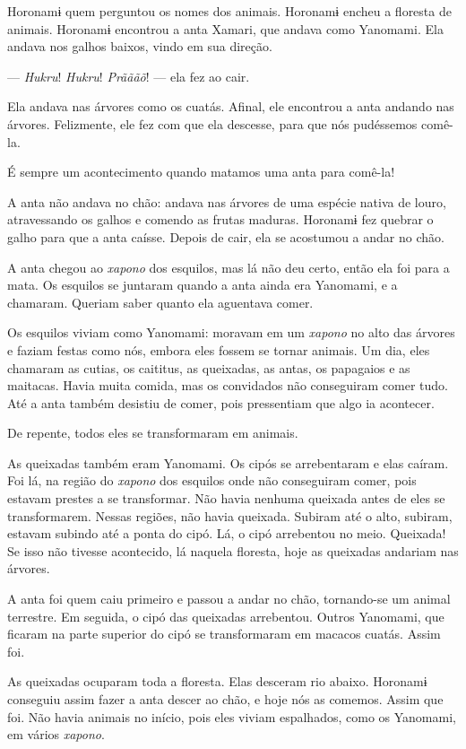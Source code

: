  Horonamɨ quem perguntou os nomes dos animais. Horonamɨ encheu a
floresta de animais. 
Horonamɨ encontrou a anta Xamari, que andava como Yanomami. Ela andava
nos galhos baixos, vindo em sua direção. 

--- \textit{Hukru}! \textit{Hukru}! \textit{Prãããõ}! --- ela fez ao cair. 

Ela andava nas árvores como os cuatás. Afinal, ele encontrou a anta
andando nas árvores. Felizmente, ele fez com que ela descesse, para que
nós pudéssemos comê-la. 

É sempre um acontecimento quando matamos uma anta para comê-la! 

A anta não andava no chão: andava nas árvores de uma espécie nativa de
louro, atravessando os galhos e comendo as frutas maduras. Horonamɨ fez
quebrar o galho para que a anta caísse. Depois de cair, ela se acostumou
a andar no chão. 

A anta chegou ao \textit{xapono} dos esquilos, mas lá não deu certo, então ela
foi para a mata. Os esquilos se juntaram quando a anta ainda era Yanomami,
e a chamaram. Queriam saber quanto ela aguentava comer.

Os esquilos viviam como Yanomami: moravam em um \textit{xapono} no alto das
árvores e faziam festas como nós, embora eles fossem se tornar animais.
Um dia, eles chamaram as cutias, os caititus, as queixadas, as antas, os
papagaios e as maitacas. Havia muita comida, mas os convidados não
conseguiram comer tudo. Até a anta também desistiu de comer, pois
pressentiam que algo ia acontecer. 

De repente, todos eles se transformaram em animais. 

As queixadas também eram Yanomami. Os cipós se
arrebentaram e elas caíram. Foi lá, na região do \textit{xapono} dos esquilos
onde não conseguiram comer, pois estavam prestes a se transformar. Não
havia nenhuma queixada antes de eles se transformarem. Nessas regiões,
não havia queixada. Subiram até o alto, subiram, estavam subindo até a
ponta do cipó. Lá, o cipó arrebentou no meio. Queixada! Se isso não
tivesse acontecido, lá naquela floresta, hoje as queixadas andariam nas
árvores. 

A anta foi quem caiu primeiro e passou a andar no chão, tornando-se um
animal terrestre. Em seguida, o cipó das queixadas arrebentou. Outros
Yanomami, que ficaram na parte superior do cipó se transformaram em
macacos cuatás. Assim foi. 

As queixadas ocuparam toda a floresta. Elas desceram rio abaixo.
Horonamɨ conseguiu assim fazer a anta descer ao chão, e hoje nós as
comemos. Assim que foi. Não havia animais no início, pois eles viviam
espalhados, como os Yanomami, em vários \textit{xapono}. 

